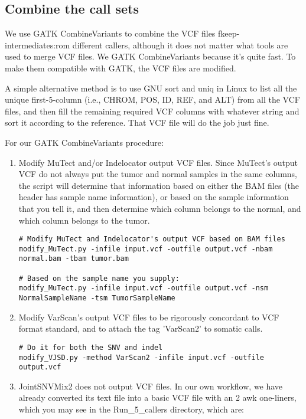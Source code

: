 \documentclass[10pt,letterpaper]{article}
\begin{document}
\begin{sloppypar}
\subsection{Combine the call sets}
	We use GATK CombineVariants to combine the VCF files fkeep-intermediates:rom different callers, although it does not matter what tools are used to merge VCF files. We GATK CombineVariants because it's quite fast. To make them compatible with GATK, the VCF files are modified.

	A simple alternative method is to use GNU sort and uniq in Linux to list all the unique first-5-column (i.e., CHROM, POS, ID, REF, and ALT) from all the VCF files, and then fill the remaining required VCF columns with whatever string and sort it according to the reference. That VCF file will do the job just fine. 

For our GATK CombineVariants procedure:

\begin{enumerate}

\item 
Modify MuTect and/or Indelocator output VCF files. 
Since MuTect's output VCF do not always put the tumor and normal samples in the same columns, the script will determine that information based on either the BAM files (the header has sample name information), or based on the sample information that you tell it, and then determine which column belongs to the normal, and which column belongs to the tumor. 
	
\begin{lstlisting}
# Modify MuTect and Indelocator's output VCF based on BAM files
modify_MuTect.py -infile input.vcf -outfile output.vcf -nbam normal.bam -tbam tumor.bam
	
# Based on the sample name you supply:
modify_MuTect.py -infile input.vcf -outfile output.vcf -nsm NormalSampleName -tsm TumorSampleName
\end{lstlisting}

\item
Modify VarScan's output VCF files to be rigorously concordant to VCF format standard, and to attach the tag 'VarScan2' to somatic calls. 
\begin{lstlisting}
# Do it for both the SNV and indel
modify_VJSD.py -method VarScan2 -infile input.vcf -outfile output.vcf
\end{lstlisting}
	

\item
JointSNVMix2 does not output VCF files. In our own workflow, we have already converted its text file into a basic VCF file with an 2 awk one-liners, which you may see in the Run\_5\_callers directory, which are:


\end{enumerate}
\end{sloppypar}
\end{document}
